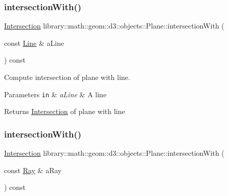 \subsubsection{\texorpdfstring{intersection\+With()}{intersectionWith()}\hspace{0.1cm}{\footnotesize\ttfamily [3/5]}}
{\footnotesize\ttfamily \hyperlink{classlibrary_1_1math_1_1geom_1_1d3_1_1_intersection}{Intersection} library\+::math\+::geom\+::d3\+::objects\+::\+Plane\+::intersection\+With (\begin{DoxyParamCaption}\item[{const \hyperlink{classlibrary_1_1math_1_1geom_1_1d3_1_1objects_1_1_line}{Line} \&}]{a\+Line }\end{DoxyParamCaption}) const}



Compute intersection of plane with line. 


\begin{DoxyParams}[1]{Parameters}
\mbox{\tt in}  & {\em a\+Line} & A line \\
\hline
\end{DoxyParams}
\begin{DoxyReturn}{Returns}
\hyperlink{classlibrary_1_1math_1_1geom_1_1d3_1_1_intersection}{Intersection} of plane with line 
\end{DoxyReturn}
\mbox{\label{classlibrary_1_1math_1_1geom_1_1d3_1_1objects_1_1_plane_a421799a25ffd95169fd2db3d6d6c7f15}} 
\subsubsection{\texorpdfstring{intersection\+With()}{intersectionWith()}\hspace{0.1cm}{\footnotesize\ttfamily [4/5]}}
{\footnotesize\ttfamily \hyperlink{classlibrary_1_1math_1_1geom_1_1d3_1_1_intersection}{Intersection} library\+::math\+::geom\+::d3\+::objects\+::\+Plane\+::intersection\+With (\begin{DoxyParamCaption}\item[{const \hyperlink{classlibrary_1_1math_1_1geom_1_1d3_1_1objects_1_1_ray}{Ray} \&}]{a\+Ray }\end{DoxyParamCaption}) const}



